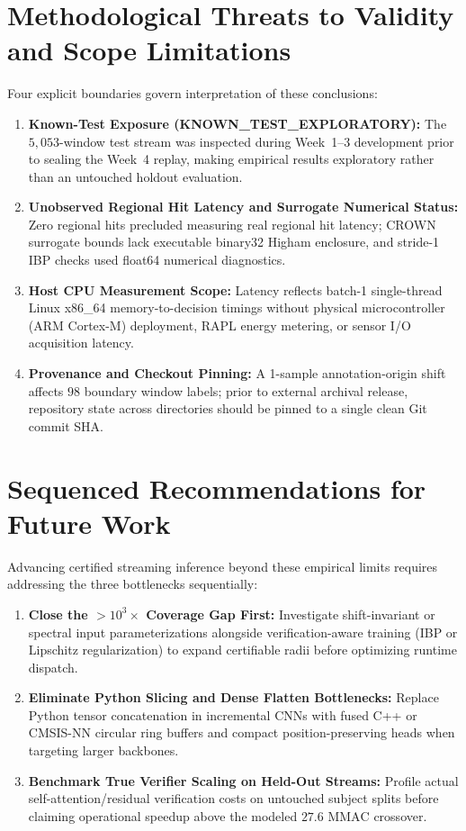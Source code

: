 \documentclass[11pt,oneside,a4paper]{report}
\newcommand{\code}[1]{{\small\upshape\ttfamily #1}}
\theoremstyle{remark}
\begin{document}
\section{Methodological Threats to Validity and Scope Limitations}
Four explicit boundaries govern interpretation of these conclusions:
\begin{enumerate}[leftmargin=1.5em]
  \item \textbf{Known-Test Exposure (\code{KNOWN\_TEST\_EXPLORATORY}):} The $5,053$-window test stream was inspected during Week~1--3 development prior to sealing the Week~4 replay, making empirical results exploratory rather than an untouched holdout evaluation.
  \item \textbf{Unobserved Regional Hit Latency and Surrogate Numerical Status:} Zero regional hits precluded measuring real regional hit latency; \code{CROWN} surrogate bounds lack executable \code{binary32} Higham enclosure, and stride-1 IBP checks used \code{float64} numerical diagnostics.
  \item \textbf{Host CPU Measurement Scope:} Latency reflects batch-1 single-thread Linux x86\_64 memory-to-decision timings without physical microcontroller (ARM Cortex-M) deployment, RAPL energy metering, or sensor I/O acquisition latency.
  \item \textbf{Provenance and Checkout Pinning:} A 1-sample annotation-origin shift affects $98$ boundary window labels; prior to external archival release, repository state across directories should be pinned to a single clean Git commit SHA.
\end{enumerate}

\section{Sequenced Recommendations for Future Work}
Advancing certified streaming inference beyond these empirical limits requires addressing the three bottlenecks sequentially:
\begin{enumerate}[leftmargin=1.5em]
  \item \textbf{Close the $>10^3\times$ Coverage Gap First:} Investigate shift-invariant or spectral input parameterizations alongside verification-aware training (IBP or Lipschitz regularization) to expand certifiable radii before optimizing runtime dispatch.
  \item \textbf{Eliminate Python Slicing and Dense Flatten Bottlenecks:} Replace Python tensor concatenation in incremental CNNs with fused C++ or CMSIS-NN circular ring buffers and compact position-preserving heads when targeting larger backbones.
  \item \textbf{Benchmark True Verifier Scaling on Held-Out Streams:} Profile actual self-attention/residual verification costs on untouched subject splits before claiming operational speedup above the modeled $27.6\text{ MMAC}$ crossover.
\end{enumerate}
\end{document}
